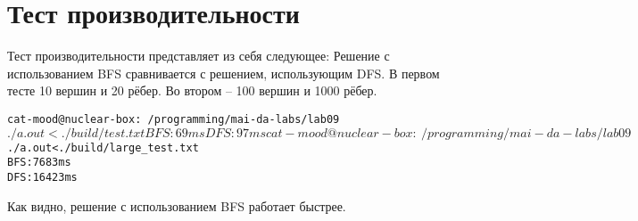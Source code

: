 \section{Тест производительности}

Тест производительности представляет из себя следующее: 
Решение с использованием BFS сравнивается с решением, использующим DFS.
В первом тесте 10 вершин и 20 рёбер. Во втором -- 100 вершин и 1000 рёбер.

\begin{alltt}
    cat-mood@nuclear-box:~/programming/mai-da-labs/lab09$ ./a.out < ./build/test.txt 
    BFS: 69 ms
    DFS: 97 ms

    cat-mood@nuclear-box:~/programming/mai-da-labs/lab09$ ./a.out < ./build/large_test.txt 
    BFS: 7683 ms
    DFS: 16423 ms
\end{alltt}

Как видно, решение с использованием BFS работает быстрее.
\pagebreak
